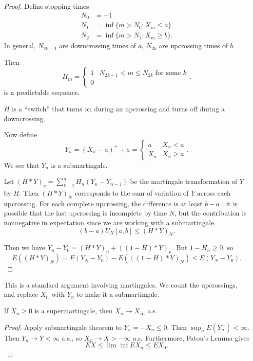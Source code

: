 
\begin{proof}
	Define stopping times
	\begin{align*}
		N_0 &=  -1 \\
		N_1 &= \inf \{m > N_0: X_m \le a\}  \\
		N_2 &= \inf \{m > N_1: X_m \ge b\}
	.\end{align*}
	In general, $N_{2k-1}$ are downcrossing times of $a$, $N_{2k}$ are upcrossing times of $b$.

	Then
	\[
		H_m = \begin{cases}
			1 & N_{2k-1} < m \le N_{2k} \text{ for some $k$}\\
			0 
		\end{cases}
	.\] 
	is a predictable sequence. 

	\begin{intuition}
		$H$ is a ``switch'' that turns on during an upcrossing and turns off during a downcrossing.
	\end{intuition}

	Now define
	\[
		Y_{n} = (X_n - a)^{+} + a = \begin{cases}
			a & X_n < a \\
			X_n & X_n \ge a
		\end{cases}
	.\] 
	We see that $Y_n$ is a submartingale.

	Let $(H * Y)_y = \sum_{k - 1}^n H_n (Y_n - Y_{n-1})$ be the martingale transformation of $Y$ by $H$. Then $(H * Y)_N$ corresponds to the sum of variation of $Y$ across each upcrossing. For each complete upcrossing, the difference is at least $b-a$ ; it is possible that the last upcrossing is incomplete by time $N$, but the contribution is nonnegative in expectation since we are working with a submartingale.
	\[
		(b-a) U_N[a,b] \le (H * Y)_N
	.\] 

	Then we have $Y_n - Y_0 = (H * Y)_n + ((1-H)*Y)_n$. But $1 - H_n \ge 0$, so 
	\[
		E((H*Y)_N) =  E(Y_N - Y_0) - E\left( ((1-H)*Y)_N \right)  \le E(Y_N - Y_0)
	.\] 
\end{proof}

\begin{remark}
	This is a standard argument involving martingales. We count the upcrossings, and replace $X_n$ with $Y_n$ to make it a submartingale.
\end{remark}

\begin{corollary}
	If $X_n \ge 0$ is a supermartingale, then $X_n \to X_{\infty }$ a.s.
\end{corollary}
\begin{proof}
	Apply submartingale theorem to $Y_n = -X_n \le 0$. Then
	$\sup _n E(Y_n^+) < \infty $. Then $Y_n \to Y < \infty $ a.s., so $X_n \to  X  > - \infty $ a.s.
	Furthermore, 
	Fatou's Lemma gives 
	\[
		EX \le \lim\inf  EX_n \le EX_0
	.\] 
\end{proof}

